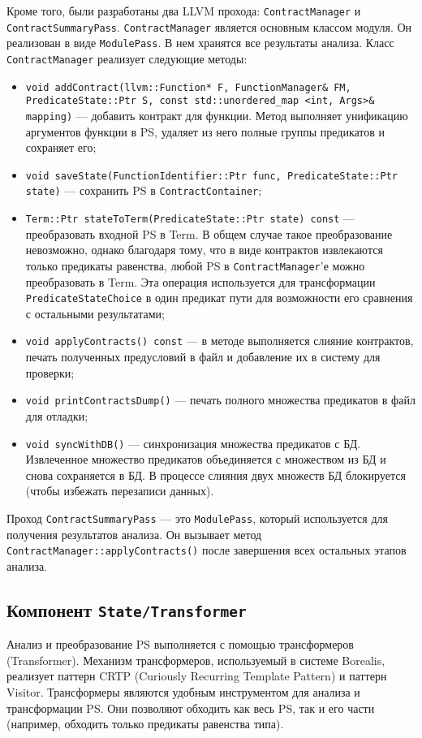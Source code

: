 Кроме того, были разработаны два LLVM прохода: \texttt{ContractManager} и \texttt{ContractSummaryPass}. \texttt{ContractManager} является основным классом модуля. Он реализован в виде \texttt{ModulePass}. В нем хранятся все результаты анализа. Класс \texttt{ContractManager} реализует следующие методы:
\begin{itemize}
\item \texttt{void addContract(llvm::Function* F, FunctionManager\& FM, PredicateState::Ptr S, const std::unordered_map <int, Args>\& mapping)} --- добавить контракт для функции. Метод выполняет унификацию аргументов функции в PS, удаляет из него полные группы предикатов и сохраняет его;
\item \texttt{void saveState(FunctionIdentifier::Ptr func, PredicateState::Ptr state)} --- сохранить PS в \texttt{ContractContainer};
\item \texttt{Term::Ptr stateToTerm(PredicateState::Ptr state) const} --- преобразовать входной PS в Term. В общем случае такое преобразование невозможно, однако благодаря тому, что в виде контрактов извлекаются только предикаты равенства, любой PS в \texttt{ContractManager}'е можно преобразовать в Term. Эта операция используется для трансформации \texttt{PredicateStateChoice} в один предикат пути для возможности его сравнения с остальными результатами;
\item \texttt{void applyContracts() const} --- в методе выполняется слияние контрактов, печать полученных предусловий в файл и добавление их в систему для проверки;
\item \texttt{void printContractsDump()} --- печать полного множества предикатов в файл для отладки;
\item \texttt{void syncWithDB()} --- синхронизация множества предикатов с БД. Извлеченное множество предикатов объединяется с множеством из БД и снова сохраняется в БД. В процессе слияния двух множеств БД блокируется (чтобы избежать перезаписи данных).
\end{itemize}

Проход \texttt{ContractSummaryPass} --- это \texttt{ModulePass}, который используется для получения результатов анализа. Он вызывает метод \texttt{ContractManager::applyContracts()} после завершения всех остальных этапов анализа.

\subsection{Компонент \texttt{State/Transformer}}
Анализ и преобразование PS выполняется с помощью трансформеров (Transformer). Механизм трансформеров, используемый в системе Borealis, реализует паттерн CRTP (Curiously Recurring Template Pattern)\cite{crtp} и паттерн Visitor\cite{patterns}. Трансформеры являются удобным инструментом для анализа и трансформации PS. Они позволяют обходить как весь PS, так и его части (например, обходить только предикаты равенства типа).

